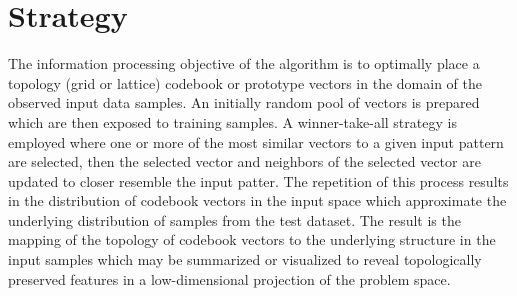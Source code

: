 \documentclass[a4paper, 11pt]{article}
\begin{document}

\section{Strategy}
\label{sec:strategy}
The information processing objective of the algorithm is to optimally place a topology (grid or lattice) codebook or prototype vectors in the domain of the observed input data samples.
An initially random pool of vectors is prepared which are then exposed to training samples. A winner-take-all strategy is employed where one or more of the most similar vectors to a given input pattern are selected, then the selected vector and neighbors of the selected vector are updated to closer resemble the input patter. The repetition of this process results in the distribution of codebook vectors in the input space which approximate the underlying distribution of samples from the test dataset. The result is the mapping of the topology of codebook vectors to the underlying structure in the input samples which may be summarized or visualized to reveal topologically preserved features in a low-dimensional projection of the problem space.
\end{document}
